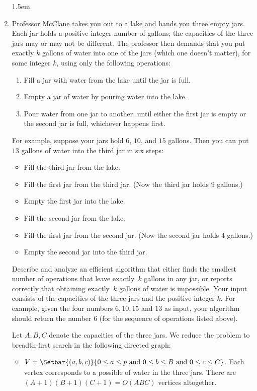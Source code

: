 \documentclass[11pt]{article}
\begin{document}
\begin{enumerate}\parindent 1.5em
\setcounter{enumi}{3}

\item

Professor McClane takes you out to a lake and hands you three empty jars.  Each jar holds a positive integer number of gallons; the capacities of the three jars may or may not be different.  The professor then demands that you put exactly $k$ gallons of water into one of the jars (which one doesn’t matter), for some integer $k$, using only the following operations:
\begin{enumerate}
\item Fill a jar with water from the lake until the jar is full.
\item Empty a jar of water by pouring water into the lake.
\item Pour water from one jar to another, until either the first jar is empty or the second jar is full, whichever happens first.
\end{enumerate}
For example, suppose your jars hold $6$, $10$, and $15$ gallons.  Then you can put $13$ gallons of water into the third jar in six steps:
\begin{itemize}\itemsep0pt
\item Fill the third jar from the lake.
\item Fill the first jar from the third jar.  (Now the third jar holds $9$ gallons.)
\item Empty the first jar into the lake.
\item Fill the second jar from the lake.
\item Fill the first jar from the second jar.  (Now the second jar holds $4$ gallons.)
\item Empty the second jar into the third jar.
\end{itemize}

Describe and analyze an efficient algorithm that either finds the smallest number of operations that leave exactly~$k$ gallons in any jar, or reports correctly that obtaining exactly~$k$ gallons of water is impossible.  Your input consists of the capacities of the three jars and the positive integer $k$.  For example, given the four numbers $6, 10, 15$ and $13$ as input, your algorithm should return the number $6$ (for the sequence of operations listed above).


\begin{solution}
Let $A,B,C$ denote the capacities of the three jars.  We reduce the problem to breadth-first search in the following directed graph:
\begin{itemize}
\item
$V = \Setbar{(a,b,c)\strut}{0\le a\le p \text{~and~} 0\le b\le B \text{~and~} 0 \le c\le C}$.  Each vertex corresponds to a possible  of water in the three jars.  There are $(A+1)(B+1)(C+1) = O(ABC)$ vertices altogether.


\end{itemize}
\end{solution}
\end{enumerate}
\end{document}
